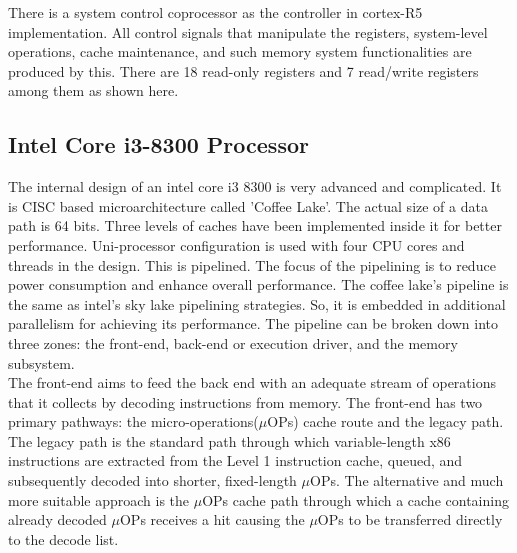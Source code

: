 \documentclass[a4paper,11pt]{article}
\begin{document}
There is a system control coprocessor as the controller in cortex-R5 implementation. All control signals that manipulate the registers, system-level operations, cache maintenance, and such memory system functionalities are produced by this. There are 18 read-only registers and 7 read/write registers among them as shown here.


\subsection{Intel Core i3-8300 Processor}
The internal design of an intel core i3 8300 is very advanced and complicated. It is CISC based microarchitecture called 'Coffee Lake'.  The actual size of a data path is 64 bits. Three levels of caches have been implemented inside it for better performance. Uni-processor configuration is used with four CPU cores and threads in the design. This is pipelined. The focus of the pipelining is to reduce power consumption and enhance overall performance. The coffee lake's pipeline is the same as intel's sky lake pipelining strategies. So, it is embedded in additional parallelism for achieving its performance. The pipeline can be broken down into three zones: the front-end, back-end or execution driver, and the memory subsystem.\\

The front-end aims to feed the back end with an adequate stream of operations that it collects by decoding instructions from memory. The front-end has two primary pathways: the micro-operations($\mu$OPs) cache route and the legacy path. The legacy path is the standard path through which variable-length x86 instructions are extracted from the Level 1 instruction cache, queued, and subsequently decoded into shorter, fixed-length $\mu$OPs. The alternative and much more suitable approach is the $\mu$OPs cache path through which a cache containing already decoded $\mu$OPs receives a hit causing the $\mu$OPs to be transferred directly to the decode list.\\
\end{document}
